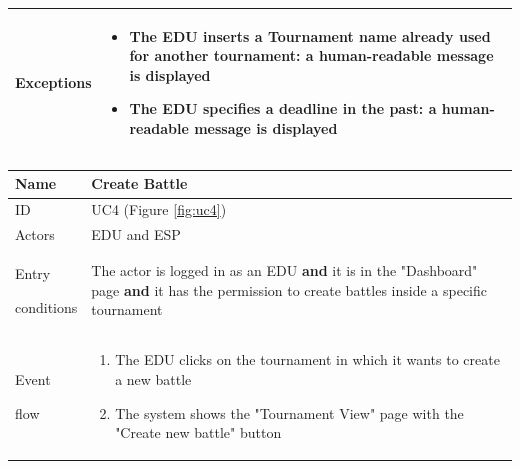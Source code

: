 \begin{center}
\begin{tabular}{| m{2cm} | m{10cm}|}
        Exceptions            & \begin{itemize}
                                    \item The EDU inserts a Tournament name already used for another tournament: a human-readable message is displayed
                                    \item The EDU specifies a deadline in the past: a human-readable message is displayed
                                \end{itemize}                                                                                                                           \\ \hline
    \end{tabular}
\end{center}

\begin{center}
    \def\arraystretch{1.5}
    \begin{tabular}{| m{2cm} | m{10cm}|}
        \hline
        Name                  & Create Battle                                                                                                                                                                       \\ \hline
        ID                    & UC4 (Figure \ref{fig:uc4})                                                                                                                                                          \\ \hline
        Actors                & EDU and ESP                                                                                                                                                                                \\ \hline
        Entry \par conditions & The actor is logged in as an EDU \textbf{and} it is in the "Dashboard" page \textbf{and} it has the permission to create battles inside a specific tournament                       \\ \hline
        Event \par flow       & \begin{enumerate}
                                    \item The EDU clicks on the tournament in which it wants to create a new battle
                                    \item The system shows the "Tournament View" page with the "Create new battle" button

\end{enumerate}
\end{tabular}
\end{center}

